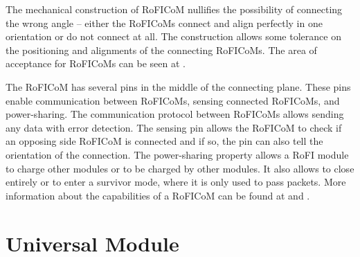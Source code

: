 \documentclass[
  printed, %
  color,   %
  notable, %
  oneside, %
  nolof,   %
  nolot,   %
  nocover,
]{fithesis3}
\begin{document}
The mechanical construction of RoFICoM nullifies the possibility of connecting the wrong angle -- either the RoFICoMs connect and align perfectly in one orientation or do not connect at all.
The construction allows some tolerance on the positioning and alignments of the connecting RoFICoMs.
The area of acceptance for RoFICoMs can be seen at \cite[p. 6]{roficom}.

The RoFICoM has several pins in the middle of the connecting plane.
These pins enable communication between RoFICoMs, sensing connected RoFICoMs, and power-sharing.
The communication protocol between RoFICoMs allows sending any data with error detection.
The sensing pin allows the RoFICoM to check if an opposing side RoFICoM is connected and if so, the pin can also tell the orientation of the connection.
The power-sharing property allows a RoFI module to charge other modules or to be charged by other modules.
It also allows to close entirely or to enter a survivor mode, where it is only used to pass packets.
More information about the capabilities of a RoFICoM can be found at \cite{roficom} and \cite{rofi-web}.

\section{Universal Module}
\label{univ-module}
\end{document}
